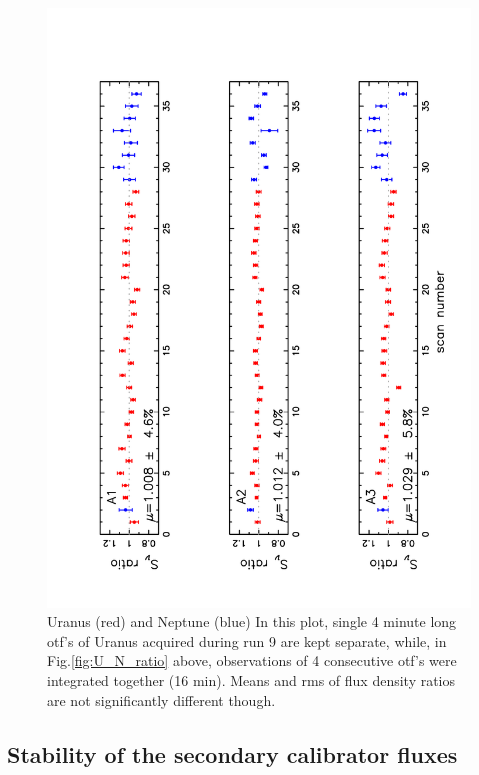 \begin{figure}[p]
\begin{center}
  \includegraphics[clip, angle=-90, scale=0.6]{Figures/Flux_ratio_index_A1_A2_A3.pdf}
  \caption[Stability of calibration with the primary calibrators]{ Uranus (red) and Neptune (blue)
    In this plot, single 4 minute long otf's of Uranus acquired during
    run 9 are kept separate, 
while, in Fig.\ref{fig:U_N_ratio} above, observations of 4 consecutive otf's were integrated together (16 min).
    Means and rms of flux density ratios are not significantly different though.}
\label{fig:U_otf_indiv}
\end{center}
\end{figure}



\subsection{Stability of the secondary calibrator fluxes}
\label{ap:aperture_photometry_secondary}

